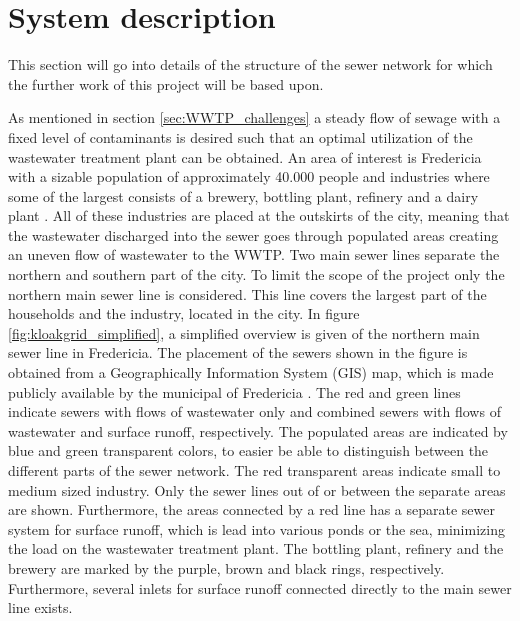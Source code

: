 \chapter{System description}\label{se:system_description}
This section will go into details of the structure of the sewer network for which the further work of this project will be based upon.

As mentioned in section \ref{sec:WWTP_challenges} a steady flow of sewage with a fixed level of contaminants is desired such that an optimal utilization of the wastewater treatment plant can be obtained. An area of interest is Fredericia with a sizable population of approximately 40.000 people and industries where some of the largest consists of a brewery, bottling plant, refinery and a dairy plant \cite{Statistic_Denmark}. All of these industries are placed at the outskirts of the city, meaning that the wastewater discharged into the sewer goes through populated areas creating an uneven flow of wastewater to the WWTP. Two main sewer lines separate the northern and southern part of the city. To limit the scope of the project only the northern main sewer line is considered. This line covers the largest part of the households and the industry, located in the city. %
In figure \ref{fig:kloakgrid_simplified}, a simplified overview is given of the northern main sewer line in Fredericia. The placement of the sewers shown in the figure is obtained from a Geographically Information System (GIS) map, which is made publicly available by the municipal of Fredericia \cite{GIS_kort}. The red and green lines indicate sewers with flows of wastewater only and combined sewers with flows of wastewater and surface runoff, respectively. The populated areas are indicated by blue and green transparent colors, to easier be able to distinguish between the different parts of the sewer network. The red transparent areas indicate small to medium sized industry. 
Only the sewer lines out of or between the separate areas are shown. Furthermore, the areas connected by a red line has a separate sewer system for surface runoff, which is lead into various ponds or the sea, minimizing the load on the wastewater treatment plant.
The bottling plant, refinery and the brewery are marked by the purple, brown and black rings, respectively. Furthermore, several inlets for surface runoff connected directly to the main sewer line exists. %


